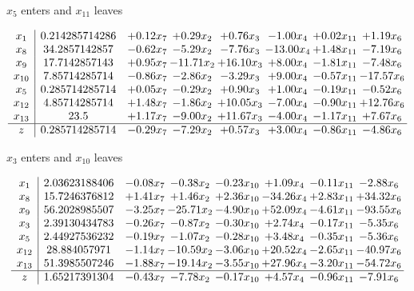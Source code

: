 \documentclass[8pt]{article}
\begin{document}
 $ x_{5} $ enters and $ x_{11} $ leaves 

 \[\begin{array}{c| c c@{\hskip 2pt} c@{\hskip 2pt} c@{\hskip 2pt} c@{\hskip 2pt} c@{\hskip 2pt} c@{\hskip 2pt} }
 x_{1}   &  0.214285714286 & +  0.12 x_{7} & +  0.29 x_{2} & +  0.76 x_{3} & -1.00 x_{4} & +  0.02 x_{11} & +  1.19 x_{6}\\
 x_{8}   &  34.2857142857 & -0.62 x_{7} & -5.29 x_{2} & -7.76 x_{3} & -13.00 x_{4} & +  1.48 x_{11} & -7.19 x_{6}\\
 x_{9}   &  17.7142857143 & +  0.95 x_{7} & -11.71 x_{2} & + 16.10 x_{3} & +  8.00 x_{4} & -1.81 x_{11} & -7.48 x_{6}\\
 x_{10}   &  7.85714285714 & -0.86 x_{7} & -2.86 x_{2} & -3.29 x_{3} & +  9.00 x_{4} & -0.57 x_{11} & -17.57 x_{6}\\
 x_{5}   &  0.285714285714 & +  0.05 x_{7} & -0.29 x_{2} & +  0.90 x_{3} & +  1.00 x_{4} & -0.19 x_{11} & -0.52 x_{6}\\
 x_{12}   &  4.85714285714 & +  1.48 x_{7} & -1.86 x_{2} & + 10.05 x_{3} & -7.00 x_{4} & -0.90 x_{11} & + 12.76 x_{6}\\
 x_{13}   &  23.5 & +  1.17 x_{7} & -9.00 x_{2} & + 11.67 x_{3} & -4.00 x_{4} & -1.17 x_{11} & +  7.67 x_{6}\\
\hline
z    &  0.285714285714 & -0.29 x_{7} & -7.29 x_{2} & +  0.57 x_{3} & +  3.00 x_{4} & -0.86 x_{11} & -4.86 x_{6}\\
\end{array}\]


 $ x_{3} $ enters and $ x_{10} $ leaves 

 \[\begin{array}{c| c c@{\hskip 2pt} c@{\hskip 2pt} c@{\hskip 2pt} c@{\hskip 2pt} c@{\hskip 2pt} c@{\hskip 2pt} }
 x_{1}   &  2.03623188406 & -0.08 x_{7} & -0.38 x_{2} & -0.23 x_{10} & +  1.09 x_{4} & -0.11 x_{11} & -2.88 x_{6}\\
 x_{8}   &  15.7246376812 & +  1.41 x_{7} & +  1.46 x_{2} & +  2.36 x_{10} & -34.26 x_{4} & +  2.83 x_{11} & + 34.32 x_{6}\\
 x_{9}   &  56.2028985507 & -3.25 x_{7} & -25.71 x_{2} & -4.90 x_{10} & + 52.09 x_{4} & -4.61 x_{11} & -93.55 x_{6}\\
 x_{3}   &  2.39130434783 & -0.26 x_{7} & -0.87 x_{2} & -0.30 x_{10} & +  2.74 x_{4} & -0.17 x_{11} & -5.35 x_{6}\\
 x_{5}   &  2.44927536232 & -0.19 x_{7} & -1.07 x_{2} & -0.28 x_{10} & +  3.48 x_{4} & -0.35 x_{11} & -5.36 x_{6}\\
 x_{12}   &  28.884057971 & -1.14 x_{7} & -10.59 x_{2} & -3.06 x_{10} & + 20.52 x_{4} & -2.65 x_{11} & -40.97 x_{6}\\
 x_{13}   &  51.3985507246 & -1.88 x_{7} & -19.14 x_{2} & -3.55 x_{10} & + 27.96 x_{4} & -3.20 x_{11} & -54.72 x_{6}\\
\hline
z    &  1.65217391304 & -0.43 x_{7} & -7.78 x_{2} & -0.17 x_{10} & +  4.57 x_{4} & -0.96 x_{11} & -7.91 x_{6}\\
\end{array}\]
\end{document}
